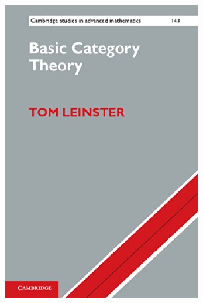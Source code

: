\documentclass{beamer}
\begin{document}
\begin{frame}
\hfill
\includegraphics[scale=0.4]{leinster.jpg}
\hfill~
\end{frame}
\begin{frame}


\end{frame}
\end{document}
